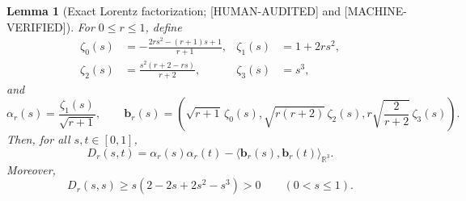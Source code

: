 \documentclass[11pt]{article}
\theoremstyle{plain}
\newtheorem{lemma}[theorem]{Lemma}
\theoremstyle{definition}
\theoremstyle{remark}
\newcommand{\RR}{\mathbb R}
\newcommand{\status}[1]{\textnormal{\textsf{\footnotesize[#1]}}}
\newcommand{\MachineVerified}{\status{MACHINE-VERIFIED}}
\newcommand{\HumanAudited}{\status{HUMAN-AUDITED}}
\begin{document}
\begin{lemma}[Exact Lorentz factorization; \HumanAudited{} and
\MachineVerified]
\label{lem:lorentz}
For \(0\le r\le1\), define
\begin{align*}
  \zeta_0(s)&=-\frac{2rs^2-(r+1)s+1}{r+1},
  &\zeta_1(s)&=1+2rs^2,\\
  \zeta_2(s)&=\frac{s^2(r+2-rs)}{r+2},
  &\zeta_3(s)&=s^3,
\end{align*}
and
\begin{equation}
  \alpha_r(s)=\frac{\zeta_1(s)}{\sqrt{r+1}},\qquad
  \boldsymbol b_r(s)=
  \left(
    \sqrt{r+1}\,\zeta_0(s),
    \sqrt{r(r+2)}\,\zeta_2(s),
    r\sqrt{\frac{2}{r+2}}\,\zeta_3(s)
  \right).
  \label{eq:alpha-b}
\end{equation}
Then, for all \(s,t\in[0,1]\),
\begin{equation}
  D_r(s,t)=\alpha_r(s)\alpha_r(t)
  -\langle\boldsymbol b_r(s),\boldsymbol b_r(t)\rangle_{\RR^3}.
  \label{eq:lorentz-factorization}
\end{equation}
Moreover,
\begin{equation}
  D_r(s,s)\ge s(2-2s+2s^2-s^3)>0
  \qquad(0<s\le1).
  \label{eq:diagonal-lower-bound}
\end{equation}
\end{lemma}
\end{document}
